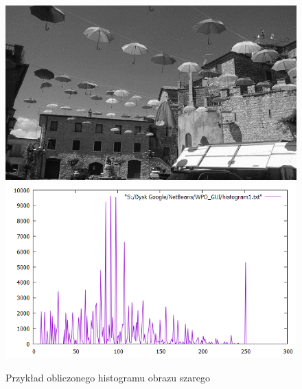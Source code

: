 \documentclass{article}
\begin{document}
	\begin{figure}[!ht]	
	\centering	
	\includegraphics[scale=2]{img/gray-obraz1}	
	\includegraphics[scale=0.4]{img/histogram/obliczanie-gray}
	\caption{Przykład obliczonego histogramu obrazu szarego}
	\label{fig15}	
	\end{figure}	
	
\end{document}
